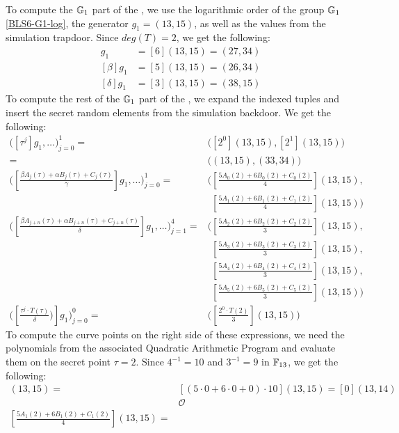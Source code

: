 \begin{example}
To compute the $\mathbb{G}_1$ part of the , we use the logarithmic order of the group $\mathbb{G}_1$ \ref{BLS6-G1-log}, the generator $g_1=(13,15)$, as well as the values from the simulation trapdoor. Since $deg(T)=2$, we get the following:
\begin{align*}
[\alpha]g_1 & = [6](13,15) = (27,34) \\
[\beta]g_1 & = [5](13,15) = (26,34) \\
[\delta]g_1 & = [3](13,15) = (38,15)
\end{align*}
To compute the rest of the $\mathbb{G}_1$ part of the , we expand the indexed tuples and insert the secret random elements from the simulation backdoor. We get the following:
\begin{align*}
\Big( [\tau^{j}]g_1,\ldots\Big) _{j=0}^{1} = 
 & \Big( [2^0](13,15), [2^1](13,15)\Big)  \\
 = & \Big((13,15),(33,34)\Big)\\
\Big([\frac{\beta A_{j}(\tau)+ \alpha B_{j}(\tau) + C_{j}(\tau)}{\gamma}]g_1,\ldots\Big)_{j=0}^1 =
 & \Big([\frac{5 A_{0}(2)+6 B_{0}(2)+C_{0}(2)}{4}](13,15),\\
 &\phantom{\Big(} [\frac{5 A_{1}(2)+6 B_{1}(2)+C_{1}(2)}{4}](13,15)\Big)\\
\Big([\frac{\beta A_{j+n}(\tau)+ \alpha B_{j+n}(\tau) + C_{j+n}(\tau)}{\delta}]g_1,\ldots\Big)_{j=1}^4 = 
&  \Big( [\frac{5 A_{2}(2)+ 6 B_{2}(2) + C_{2}(2)}{3}](13,15),\\ 
& \phantom{\Big(} [\frac{5 A_{3}(2)+ 6 B_{3}(2) + C_{3}(2)}{3}](13,15),\\
& \phantom{\Big(} [\frac{5 A_{4}(2)+ 6 B_{4}(2) + C_{4}(2)}{3}](13,15),\\ 
& \phantom{\Big(} [\frac{5 A_{5}(2)+ 6 B_{5}(2) + C_{5}(2)}{3}](13,15)\Big)\\
\Big([\frac{\tau^j\cdot T(\tau)}{\delta})]g_1\Big)_{j=0}^0 = & \Big([\frac{2^0\cdot T(2)}{3}](13,15)\Big) 
\end{align*}
To compute the curve points on the right side of these expressions, we need the polynomials from the associated Quadratic Arithmetic Program and evaluate them on the secret point $\tau=2$. Since $4^{-1}=10$ and $3^{-1}=9$ in $\mathbb{F}_{13}$, we get the following:
\begin{align*}
[\frac{5 A_{0}(2)+6 B_{0}(2)+C_{0}(2)}{4}](13,15) = 
 & [(5 \cdot 0 +6\cdot 0 + 0)\cdot 10](13,15) = [0](13,14)\\
 & \mathcal{O} \\
[\frac{5 A_{1}(2)+6 B_{1}(2)+C_{1}(2)}{4}](13,15) = 

\end{align*}
\end{example}
